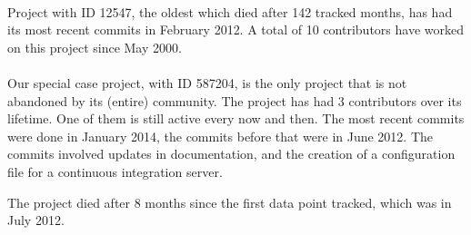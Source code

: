 \paragraph{}
Project with ID 12547, the oldest which died after 142 tracked months, has had
its most recent commits in February 2012. A total of 10 contributors have worked
on this project since May 2000.

\paragraph{}
Our special case project, with ID 587204, is the only project that is not
abandoned by its (entire) community. The project has had 3 contributors over its
lifetime. One of them is still active every now and then. The most recent
commits were done in January 2014, the commits before that were in June 2012.
The commits involved updates in documentation, and the creation of a
configuration file for a continuous integration server.

The project died after 8 months since the first data point tracked, which was in
July 2012.

\begin{comment}
This chapter presents and clarifies the results obtained during the research.
The focus should be on the factual results, not the interpretation or
discussion. Tables and graphics should be used to increase the clarity of the
results where applicable.
Have a look at the the results chapter in this example thesis on Paul’s
homepage\footnote{http://homepages.cwi.nl/~paulk/thesesMasterSoftwareEngineering/2006/ArnoldLankamp.pdf}.
\end{comment}
